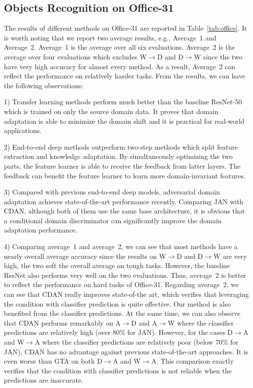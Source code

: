 \documentclass[sigconf]{acmart}
\begin{document}
\subsection{Objects Recognition on Office-31}
The results of different methods on Office-31 are reported in Table~\ref{tab:office}. It is worth noting that we report two average results, e.g., Average~1 and Average~2. Average~1 is the average over all six evaluations. Average~2 is the average over four evaluations which excludes W$\rightarrow$D and D$\rightarrow$W since the two have very high accuracy for almost every method. As a result, Average~2 can reflect the performance on relatively harder tasks. From the results, we can have the following observations:

1) Transfer learning methods perform much better than the baseline ResNet-50 which is trained on only the source domain data. It proves that domain adaptation is able to minimize the domain shift and it is practical for real-world applications.

2) End-to-end deep methods outperform two-step methods which split feature extraction and knowledge adaptation. By simultaneously optimizing the two parts, the feature learner is able to receive the feedback from latter layers. The feedback can benefit the feature learner to learn more domain-invariant features.

3) Compared with previous end-to-end deep models, adversarial domain adaptation achieves state-of-the-art performance recently. Comparing JAN with CDAN, although both of them use the same base architecture, it is obvious that a conditional domain discriminator can significantly improve the domain adaptation performance.

4) Comparing average~1 and average~2, we can see that most methods have a nearly overall average accuracy since the results on W$\rightarrow$D and D$\rightarrow$W are very high, the two soft the overall average on tough tasks. However, the baseline ResNet also performs very well on the two evaluations. Thus, average~2 is better to reflect the performance on hard tasks of Office-31. Regarding average~2, we can see that CDAN really improves state-of-the art, which verifies that leveraging the condition with classifier prediction is quite effective. Our method is also benefited from the classifier predictions. At the same time, we can also observe that CDAN performs remarkably on A$\rightarrow$D and A$\rightarrow$W where the classifier predictions are relatively high (over 80\% for JAN). However, for the cases D$\rightarrow$A and W$\rightarrow$A where the classifier predictions are relatively poor (below 70\% for JAN), CDAN has no advantage against previous state-of-the-art approaches. It is even worse than GTA on both D$\rightarrow$A and W$\rightarrow$A. This comparison exactly verifies that the condition with classifier predictions is not reliable when the predictions are inaccurate.
\end{document}
